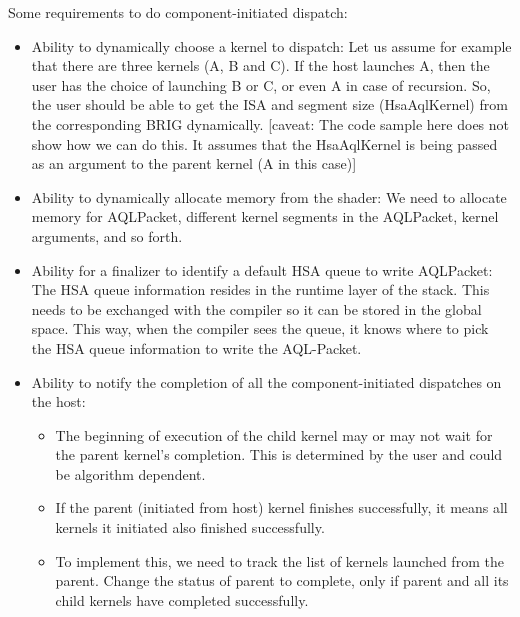 \documentclass[draft]{book}
\begin{document}
Some requirements to do component-initiated dispatch:
\begin{itemize}
\item Ability to dynamically choose a kernel to dispatch: Let us assume for
  example that there are three kernels (A, B and C). If the host launches A,
  then the user has the choice of launching B or C, or even A in case of
  recursion. So, the user should be able to get the ISA and segment size
  (Hsa\-Aql\-Kernel) from the corresponding BRIG dynamically. \mbox{[}caveat:
  The code sample here does not show how we can do this. It assumes that the
  Hsa\-Aql\-Kernel is being passed as an argument to the parent kernel (A in
  this case)\mbox{]}

\item Ability to dynamically allocate memory from the shader: We need to
  allocate memory for AQL\-Packet, different kernel segments in the AQL\-Packet,
  kernel arguments, and so forth.

\item Ability for a finalizer to identify a default HSA queue to write
  AQL\-Packet: The HSA queue information resides in the runtime layer of the
  stack. This needs to be exchanged with the compiler so it can be stored in the
  global space. This way, when the compiler sees the queue, it knows where to
  pick the HSA queue information to write the AQL-Packet.

\item Ability to notify the completion of all the component-initiated
  dispatches on the host:

\begin{itemize}
\item The beginning of execution of the child kernel may or may not wait for the
  parent kernel's completion. This is determined by the user and could be
  algorithm dependent.
\item If the parent (initiated from host) kernel finishes successfully, it means
  all kernels it initiated also finished successfully.
\item To implement this, we need to track the list of kernels launched from the
  parent. Change the status of parent to complete, only if parent and all its
  child kernels have completed successfully.
\end{itemize}
\end{itemize}
\end{document}
